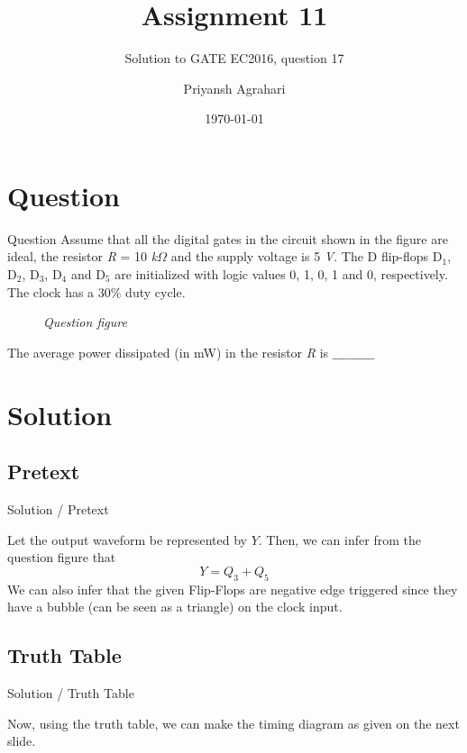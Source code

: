 \documentclass{beamer}
\title{Assignment 11}
\subtitle{Solution to GATE EC2016, question 17}
\author{Priyansh Agrahari}
\institute{IIIT Raichur}
\date{\today}
\begin{document}
\begin{frame}
\maketitle
\end{frame}

\section{Question}
\begin{frame}{Question}
    Assume that all the digital gates in the circuit shown in the figure are ideal, the resistor \textit{R} = 10 \textit{k}$\Omega$ and the supply voltage is 5 \textit{V}. The D flip-flops D$_1$, D$_2$, D$_3$, D$_4$ and D$_5$ are initialized with logic values 0, 1, 0, 1 and 0, respectively. The clock has a 30\% duty cycle.

\begin{figure}[h]
    \centering
    \scalebox{0.6}{
     }
    \caption{\textit{Question figure}}
    \label{fig:ques}
\end{figure}

The average power dissipated (in mW) in the resistor \textit{R} is $\_\_\_\_\_\_\_\_\_\_$
\end{frame}

\section{Solution}

\subsection{Pretext}
\begin{frame}{Solution / Pretext}
\begin{figure}[h]
    \centering
    \scalebox{0.6}{
     }
    \label{fig:ques_}
\end{figure}
    Let the output waveform be represented by $Y$. Then, we can infer from the question figure that
\begin{equation}
    Y=Q_3+Q_5
\end{equation}
    We can also infer that the given Flip-Flops are negative edge triggered since they have a bubble (can be seen as a triangle) on the clock input.
\end{frame}

\subsection{Truth Table}
\begin{frame}{Solution / Truth Table}
    \begin{table}[H]
    \centering
    \caption{\textit{Truth Table for the Circuit Diagram given in the Question Figure}}
    \label{tab:table}
\end{table}
Now, using the truth table, we can make the timing diagram as given on the next slide.
\end{frame}
\end{document}
